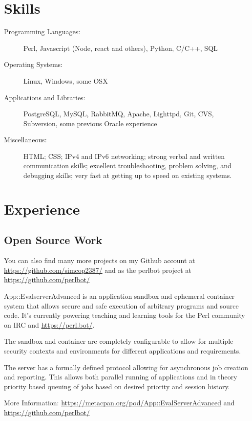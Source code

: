 \documentclass[table,tmargin=1in,bmargin=1in,letterpaper]{resume}
\author{Ryan Voots}
\begin{document}
\maketitle
\vspace{0.1in}

\section{Skills}
\begin{description}
\item[Programming Languages:]
Perl, Javascript (Node, react and others), Python, C/C++, SQL
\item[Operating Systems:]
Linux, Windows, some OSX
\item[Applications and Libraries:]
PostgreSQL, MySQL, RabbitMQ, Apache, Lighttpd, Git, CVS, Subversion, some previous Oracle experience
\item[Miscellaneous:]
HTML; CSS; IPv4 and IPv6 networking; strong verbal and written communication skills; excellent troubleshooting, problem solving, and debugging skills; very fast at getting up to speed on existing systems.
\end{description}

\section{Experience}

\subsection{Open Source Work}

\begin{compactitem}
\item You can also find many more projects on my Github account at \url{https://github.com/simcop2387/} and as the perlbot project at \url{https://github.com/perlbot/}
\end{compactitem}

\begin{compactitem}
\item App::EvalserverAdvanced is an application sandbox and ephemeral container system that allows secure and safe execution of arbitrary programs and source code.  It's currently powering teaching and learning tools for the Perl community on IRC and \url{https://perl.bot/}. 
\item The sandbox and container are completely configurable to allow for multiple security contexts and environments for different applications and requirements.
\item The server has a formally defined protocol allowing for asynchronous job creation and reporting.  This allows both parallel running of applications and in theory priority based queuing of jobs based on desired priority and session history.
\item More Information: \url{https://metacpan.org/pod/App::EvalServerAdvanced} and \url{https://github.com/perlbot/}
\end{compactitem}
\end{document}
